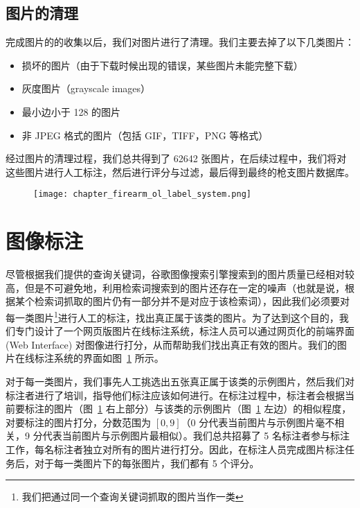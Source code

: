 \subsection{图片的清理}
完成图片的的收集以后，我们对图片进行了清理。我们主要去掉了以下几类图片：
\begin{itemize}
\item 损坏的图片（由于下载时候出现的错误，某些图片未能完整下载）
\item 灰度图片（grayscale images）
\item 最小边小于 128 的图片
\item 非 JPEG 格式的图片（包括 GIF，TIFF，PNG 等格式）
\end{itemize}

经过图片的清理过程，我们总共得到了 62642 张图片，在后续过程中，我们将对这些图片进行人工标注，然后进行评分与过滤，最后得到最终的枪支图片数据库。

\begin{figure}[!t]
	\centering
	\texttt{[image: chapter\_firearm\_ol\_label\_system.png]}
	\label{fig:online_label_system}
\end{figure}

\section{图像标注}\label{sec:image_labeling}

尽管根据我们提供的查询关键词，谷歌图像搜索引擎搜索到的图片质量已经相对较高，但是不可避免地，利用检索词搜索到的图片还存在一定的噪声（也就是说，根据某个检索词抓取的图片仍有一部分并不是对应于该检索词），因此我们必须要对每一类图片\footnote{我们把通过同一个查询关键词抓取的图片当作一类}进行人工的标注，找出真正属于该类的图片。为了达到这个目的，我们专门设计了一个网页版图片在线标注系统，标注人员可以通过网页化的前端界面 (Web Interface) 对图像进行打分，从而帮助我们找出真正有效的图片。我们的图片在线标注系统的界面如图~\ref{fig:online_label_system} 所示。

对于每一类图片，我们事先人工挑选出五张真正属于该类的示例图片，然后我们对标注者进行了培训，指导他们标注应该如何进行。在标注过程中，标注者会根据当前要标注的图片（图~\ref{fig:online_label_system} 右上部分）与该类的示例图片（图~\ref{fig:online_label_system} 左边）的相似程度，对要标注的图片打分，分数范围为 $[0,9]$（0 分代表当前图片与示例图片毫不相关，9 分代表当前图片与示例图片最相似）。我们总共招募了 5 名标注者参与标注工作，每名标注者独立对所有的图片进行打分。因此，在标注人员完成图片标注任务后，对于每一类图片下的每张图片，我们都有 5 个评分。

